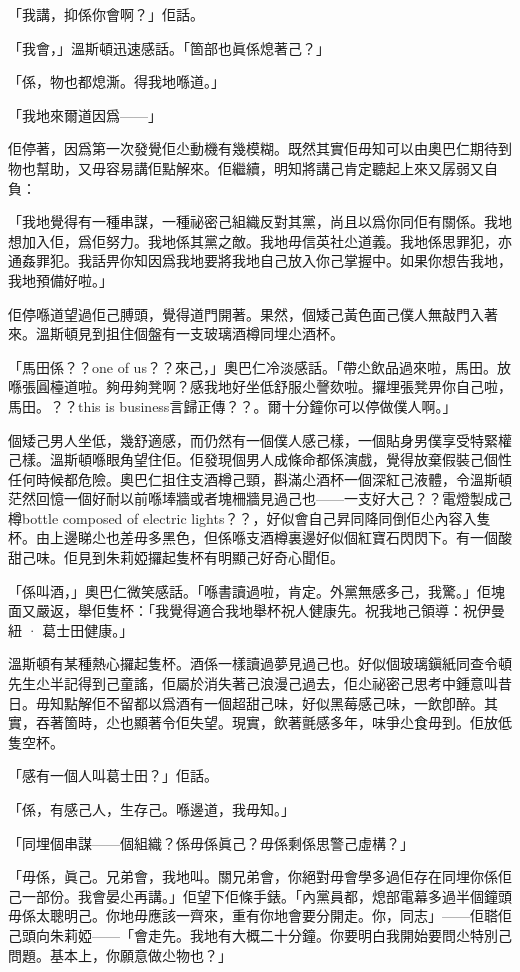 「我講，抑係你會啊？」佢話。

「我會，」溫斯頓迅速感話。「箇部也眞係熄著己？」

「係，物也都熄澌。得我地喺道。」

「我地來爾道因爲——」

佢停著，因爲第一次發覺佢尐動機有幾模糊。既然其實佢毋知可以由奧巴仁期待到物也幫助，又毋容易講佢點解來。佢繼續，明知將講己肯定聽起上來又孱弱又自負：

「我地覺得有一種串謀，一種祕密己組織反對其黨，尚且以爲你同佢有關係。我地想加入佢，爲佢努力。我地係其黨之敵。我地毋信英社尐道義。我地係思罪犯，亦通姦罪犯。我話畀你知因爲我地要將我地自己放入你己掌握中。如果你想告我地，我地預備好啦。」

佢停喺道望過佢己膊頭，覺得道門開著。果然，個矮己黃色面己僕人無敲門入著來。溫斯頓見到抯住個盤有一支玻璃酒樽同埋尐酒杯。

「馬田係？？one of us？？來己，」奧巴仁冷淡感話。「帶尐飲品過來啦，馬田。放喺張圓檯道啦。夠毋夠凳啊？感我地好坐低舒服尐謦欬啦。攞埋張凳畀你自己啦，馬田。？？this is business言歸正傳？？。爾十分鐘你可以停做僕人啊。」

個矮己男人坐低，幾舒適感，而仍然有一個僕人感己樣，一個貼身男僕享受特緊權己樣。溫斯頓喺眼角望住佢。佢發現個男人成條命都係演戲，覺得放棄假裝己個性任何時候都危險。奧巴仁抯住支酒樽己頸，斟滿尐酒杯一個深紅己液體，令溫斯頓茫然回憶一個好耐以前喺埲牆或者塊柵牆見過己也——一支好大己？？電燈製成己樽bottle composed of electric lights？？，好似會自己昇同降同倒佢尐內容入隻杯。由上邊睇尐也差毋多黑色，但係喺支酒樽裏邊好似個紅寶石閃閃下。有一個酸甜己味。佢見到朱莉婭攞起隻杯有明顯己好奇心聞佢。

「係叫酒，」奧巴仁微笑感話。「喺書讀過啦，肯定。外黨無感多己，我驚。」佢塊面又嚴返，舉佢隻杯：「我覺得適合我地舉杯祝人健康先。祝我地己領導：祝伊曼紐 · 葛士田健康。」

溫斯頓有某種熱心攞起隻杯。酒係一樣讀過夢見過己也。好似個玻璃鎭紙同查令頓先生尐半記得到己童謠，佢屬於消失著己浪漫己過去，佢尐祕密己思考中鍾意叫昔日。毋知點解佢不留都以爲酒有一個超甜己味，好似黑莓感己味，一飲卽醉。其實，吞著箇時，尐也顯著令佢失望。現實，飲著氈感多年，味爭尐食毋到。佢放低隻空杯。

「感有一個人叫葛士田？」佢話。

「係，有感己人，生存己。喺邊道，我毋知。」

「同埋個串謀——個組織？係毋係眞己？毋係剩係思警己虛構？」

「毋係，眞己。兄弟會，我地叫。關兄弟會，你絕對毋會學多過佢存在同埋你係佢己一部份。我會晏尐再講。」佢望下佢條手錶。「內黨員都，熄部電幕多過半個鐘頭毋係太聰明己。你地毋應該一齊來，重有你地會要分開走。你，同志」——佢𦖿佢己頭向朱莉婭——「會走先。我地有大概二十分鐘。你要明白我開始要問尐特別己問題。基本上，你願意做尐物也？」

